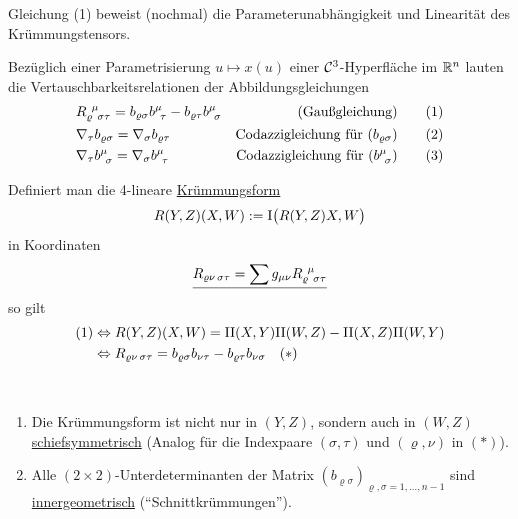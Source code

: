 \begin{bemerkung}
 Gleichung (1) beweist (nochmal) die Parameterunabhängigkeit und Linearität des Krümmungs\-tensors.
\end{bemerkung}
\setcounter{korollar}{1}
\begin{korollar}\label{korollar252}
 Bezüglich einer Parametrisierung \(u \mapsto x(u)\) einer \(\mathcal{C}^3\)-Hyperfläche im \(\mathbb{R}^n\) lauten die Vertauschbarkeitsrelationen der Abbildungsgleichungen
 \begin{align*}
  &R_{\varrho \;\, \sigma \tau}^{\;\, \mu} = b_{\varrho \sigma} b^{\mu}_{\;\, \tau} - b_{\varrho \tau} b^{\mu}_{\;\, \sigma} &\text{(Gaußgleichung)} \tag{1} \\
  &\nabla_\tau b_{\varrho \sigma} = \nabla_\sigma b_{\varrho \tau} &\text{Codazzigleichung für } (b_{\varrho \sigma}) \tag{2} \\
  &\nabla_\tau b^{\mu}_{\;\, \sigma} = \nabla_\sigma b^{\mu}_{\;\, \tau} &\text{Codazzigleichung für } (b^{\mu}_{\;\, \sigma}) \tag{3}
 \end{align*}
\end{korollar}

Definiert man die 4-lineare \uline{Krümmungsform}
\[
 R(Y,Z) (X,W) := \Rom1 \big(R(Y,Z)X, W\big)
\]
in Koordinaten
\[
 \uline{R_{\varrho \nu \,\sigma \tau} = \sum g_{\mu \nu} \riem \varrho \mu \sigma \tau}
\]
so gilt
\begin{align*}
 (1) &\Leftrightarrow R(Y,Z)(X,W) = \Rom2(X,Y) \Rom2(W,Z) - \Rom2(X,Z) \Rom2(W,Y) \\
 &\Leftrightarrow R_{\varrho \nu \,\sigma \tau} = b_{\varrho \sigma} b_{\nu \tau} - b_{\varrho \tau} b_{\nu \sigma} \quad (\ast)
\end{align*}

\begin{folgerung} \(\)
 \begin{enumerate}
  \item Die Krümmungsform ist nicht nur in \((Y,Z)\), sondern auch in \((W,Z)\) \uline{schiefsymmetrisch} \big(Analog für die Indexpaare \((\sigma, \tau)\) und \((\varrho, \nu)\) in \((\ast)\)\big).
  \item Alle \((2 \times 2)\)-Unterdeterminanten der Matrix \((b_{\varrho \sigma})_{\varrho, \sigma = 1, \dots, n-1}\) sind \uline{innergeometrisch} ("`Schnittkrümmungen"').
 \end{enumerate}
\end{folgerung}

